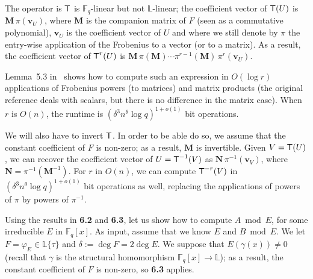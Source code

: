 \documentclass[sigconf]{acmart}
\newcommand{\F}{\mathbb{F}}
\renewcommand{\L}{\mathbb{L}}
\newcommand{\ang}[1]{\{#1\}}
\begin{document}
The operator is $\text{\sf T}$ is $\F_q$-linear but not $\L$-linear;
the coefficient vector of $\text{\sf T}(U)$ is ${\bm M}\, \pi({\bm
  v}_U)$, where ${\bm M}$ is the companion matrix of $F$ (seen as a
commutative polynomial), ${\bm v}_U$ is the coefficient vector of $U$
and where we still denote by $\pi$ the entry-wise application of the
Frobenius to a vector (or to a matrix). As a result, the coefficient
vector of $\text{\sf T}^r(U)$ is ${\bm M}\, \pi({\bm M}) \cdots
\pi^{r-1}({\bm M})\, \pi^r({\bm v}_U)$.

Lemma~5.3 in~\cite{vonzurGathen1992} shows how to compute such an
expression in $O(\log r)$ applications of Frobenius powers (to
matrices) and matrix products (the original reference deals with
scalars, but there is no difference in the matrix case). When $r$ is
$O(n)$, the runtime is $(\delta^3 n^\theta \log q)^{1+o(1)}$ bit
operations.

\smallskip{} We will also have to invert $\text{\sf
  T}$.  In order to be able do so, we assume that the constant
coefficient of $F$ is non-zero; as a result, ${\bm M}$ is invertible.
Given $V=\text{\sf T}(U)$, we can recover the coefficient vector
of $U=\text{\sf T}^{-1}(V)$ as ${\bm N}\, \pi^{-1}({\bm v}_V)$, where
${\bm N}=\pi^{-1}({\bm M}^{-1})$. For $r$ in $O(n)$, we can compute
$\text{\sf T}^{-r}(V)$ in $(\delta^3 n^\theta \log q)^{1+o(1)}$ bit
operations as well, replacing the applications of powers of $\pi$ by
powers of $\pi^{-1}$.

\smallskip{} Using the results in {\bf 6.2} and {\bf
  6.3}, let us show how to compute $A \bmod E$, for some irreducible
$E$ in $\F_q[x]$. As input, assume that we know $E$ and $B \bmod
E$. We let $F=\varphi_E \in \L\ang{\tau}$ and $\delta := \deg F = 2
\deg E$. We suppose that $E(\gamma(x)) \ne 0$ (recall that $\gamma$ is
the structural homomorphism $\F_q[x] \to \L$); as a result, the
constant coefficient of $F$ is non-zero, so {\bf 6.3} applies.
\end{document}
